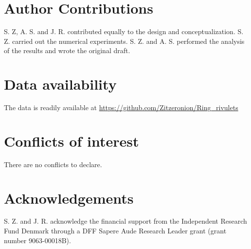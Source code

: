 \documentclass[twoside,twocolumn,9pt]{article}
\renewcommand{\refname}{Notes and references}
\begin{document}
\section*{Author Contributions}
S. Z, A. S. and J. R.  contributed equally to the design and conceptualization. S. Z. carried out the numerical experiments. S. Z. and A. S. performed the analysis of the results and wrote the original draft. 

\section*{Data availability}
The data is readily available at \href{https://github.com/Zitzeronion/Ring_rivulets}{https://github.com/Zitzeronion/Ring\_rivulets}

\section*{Conflicts of interest}
There are no conflicts to declare.

\section*{Acknowledgements}
S. Z. and J. R. acknowledge the financial support from the Independent Research Fund Denmark through a DFF Sapere Aude Research Leader grant (grant number 9063-00018B).





\balance

\end{document}
